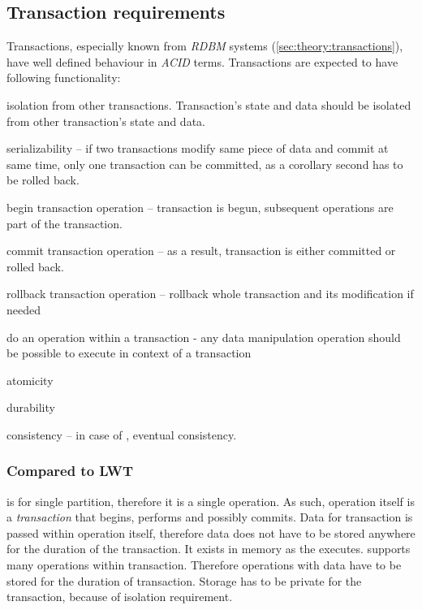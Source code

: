 \subsection{Transaction requirements}
Transactions, especially known from \emph{RDBM} systems (\ref{sec:theory:transactions}), have well defined behaviour in \emph{ACID} terms. Transactions are expected to have following functionality:
\begin{enumerate*}
\item isolation from other transactions. Transaction's state and data should be isolated from other transaction's state and data.
\item serializability -- if two transactions modify same piece of data and commit at same time, only one transaction can be committed, as a corollary second has to be rolled back.
\item begin transaction operation -- transaction is begun, subsequent operations are part of the transaction. 
\item commit transaction operation -- as a result, transaction is either committed or rolled back.
\item rollback transaction operation -- rollback whole transaction and its modification if needed
\item do an operation within a transaction - any data manipulation operation should be possible to execute in context of a transaction
\item atomicity
\item durability
\item consistency -- in case of \mpp, eventual consistency.
\end{enumerate*}

\subsubsection{Compared to LWT}
\lwt is for single partition, therefore it is a single operation. As such, operation itself is a \emph{transaction} that begins, performs and possibly commits. Data for \lwt transaction is passed within operation itself, therefore data does not have to be stored anywhere for the duration of the transaction. It exists in memory as the \lwt executes.
\mpp supports many operations within transaction. Therefore operations with data have to be stored for the duration of transaction. Storage has to be private for the transaction, because of isolation requirement.

